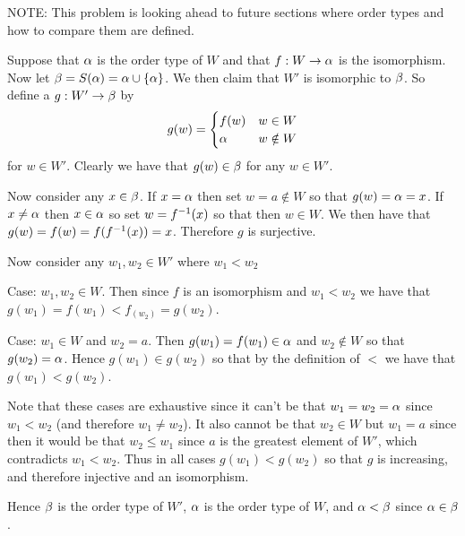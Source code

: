 
\begin{solution}
	NOTE: This problem is looking ahead to future sections where order types and how to compare them are defined.

    Suppose that $\alpha$ is the order type of $W$ and that $f : W \to \alpha$ is the isomorphism.
    Now let $\beta = S(\alpha) = \alpha \cup \left\{ \alpha \right\}$.
    We then claim that $W'$ is isomorphic to $\beta$.
    So define a $g : W' \to \beta$ by
    $$
    g(w) = \begin{cases}
         f(w) & w \in W \\
         \alpha & w \notin W
    \end{cases}
    $$
    for $w \in W'$.
    Clearly we have that $g(w) \in \beta$ for any $w \in W'$.

    Now consider any $x \in \beta$.
    If $x = \alpha$ then set $w = a \notin W$ so that $g(w) = \alpha = x$.
    If $x \neq \alpha$ then $x \in \alpha$ so set $w = f^{-1}(x)$ so that then $w \in W$.
    We then have that $g(w) = f(w) = f(f^{-1}(x)) = x$.
    Therefore $g$ is surjective.

    Now consider any $w_1, w_2 \in W'$ where $w_1 < w_2$

    Case: $w_1, w_2 \in W$.
    Then since $f$ is an isomorphism and $w_1 < w_2$ we have that $g(w_1) = f(w_1) < f_(w_2) = g(w_2)$.

    Case: $w_1 \in W$ and $w_2 = a$.
    Then $g(w_1) = f(w_1) \in \alpha$ and $w_2 \notin W$ so that $g(w_2) = \alpha$.
    Hence $g(w_1) \in g(w_2)$ so that by the definition of $<$ we have that $g(w_1) < g(w_2)$.

    Note that these cases are exhaustive since it can't be that $w_1 = w_2 = \alpha$ since $w_1 < w_2$ (and therefore $w_1 \neq w_2$).
    It also cannot be that $w_2 \in W$ but $w_1 = a$ since then it would be that $w_2 \leq w_1$ since $a$ is the greatest element of $W'$, which contradicts $w_1 < w_2$.
    Thus in all cases $g(w_1) < g(w_2)$ so that $g$ is increasing, and therefore injective and an isomorphism.

    Hence $\beta$ is the order type of $W'$, $\alpha$ is the order type of $W$, and $\alpha < \beta$ since $\alpha \in \beta$. \qedsymbol
\end{solution}


